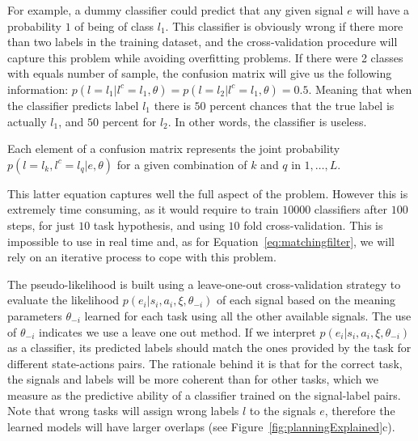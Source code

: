 For example, a dummy classifier could predict that any given signal $e$ will have a probability $1$ of being of class $l_1$. This classifier is obviously wrong if there more than two labels in the training dataset, and the cross-validation procedure will capture this problem while avoiding overfitting problems. If there were 2 classes with equals number of sample, the confusion matrix will give us the following information: $p(l = l_1| l^c = l_1, \theta) = p(l = l_2| l^c = l_1, \theta) = 0.5$. Meaning that when the classifier predicts label $l_1$ there is $50$ percent chances that the true label is actually $l_1$, and $50$ percent for $l_2$. In other words, the classifier is useless.

Each element of a confusion matrix represents the joint probability $p(l = l_k, l^c = l_q| e, \theta)$ for a given combination of $k$ and $q$ in $1, \ldots, L$. 



This latter equation captures well the  full aspect of the problem. However this is extremely time consuming, as it would require to train $10000$ classifiers after $100$ steps, for just $10$ task hypothesis, and using $10$ fold cross-validation. This is impossible to use in real time and, as for Equation~\ref{eq:matchingfilter}, we will rely on an iterative process to cope with this problem.





The pseudo-likelihood is built using a leave-one-out cross-validation strategy to evaluate the likelihood $p(e_i | s_i, a_i, \xi, \theta_{-i})$ of each signal based on the meaning parameters $\theta_{-i}$ learned for each task using all the other available signals. The use of $\theta_{-i}$ indicates we use a leave one out method. If we interpret $p(e_i | s_i,a_i,\xi,\theta_{-i})$ as a classifier, its predicted labels should match the ones provided by the task for different state-actions pairs. The rationale behind it is that for the correct task, the signals and labels will be more coherent than for other tasks, which we measure as the predictive ability of a classifier trained on the signal-label pairs. Note that wrong tasks will assign wrong labels $l$ to the signals $e$, therefore the learned models will have larger overlaps (see Figure~\ref{fig:planningExplained}c). 

